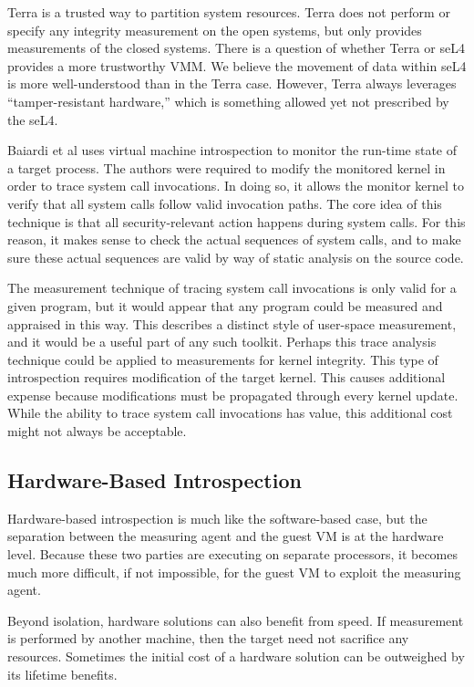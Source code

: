 \documentclass[a4paper,twoside]{article}
\begin{document}
Terra is a trusted way to partition system resources. Terra does not perform or specify any integrity measurement on the open systems, but only provides measurements of the closed systems. There is a question of whether Terra or seL4 provides a more trustworthy VMM. We believe the movement of data within seL4 is more well-understood than in the Terra case. However, Terra always leverages ``tamper-resistant hardware,'' which is something allowed yet not prescribed by the seL4.

Baiardi et al \cite{TransProcMon} uses virtual machine introspection to monitor the run-time state of a target process. The authors were required to modify the monitored kernel in order to trace system call invocations. In doing so, it allows the monitor kernel to verify that all system calls follow valid invocation paths. The core idea of this technique is that all security-relevant action happens during system calls. For this reason, it makes sense to check the actual sequences of system calls, and to make sure these actual sequences are valid by way of static analysis on the source code.

The measurement technique of tracing system call invocations is only valid for a given program, but it would appear that any program could be measured and appraised in this way. This describes a distinct style of user-space measurement, and it would be a useful part of any such toolkit. Perhaps this trace analysis technique could be applied to measurements for kernel integrity. This type of introspection requires modification of the target kernel. This causes additional expense because modifications must be propagated through every kernel update. While the ability to trace system call invocations has value, this additional cost might not always be acceptable.

\subsection{Hardware-Based Introspection}
Hardware-based introspection is much like the software-based case, but the separation between the measuring agent and the guest VM is at the hardware level. Because these two parties are executing on separate processors, it becomes much more difficult, if not impossible, for the guest VM to exploit the measuring agent.

Beyond isolation, hardware solutions can also benefit from speed. If measurement is performed by another machine, then the target need not sacrifice any resources. Sometimes the initial cost of a hardware solution can be outweighed by its lifetime benefits.
\end{document}
